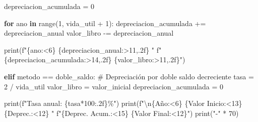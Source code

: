 \documentclass[
  doc,
  floatsintext,
  longtable,
  a4paper,
  nolmodern,
  notxfonts,
  notimes,
  12pt,
  colorlinks=true,linkcolor=blue,citecolor=blue,urlcolor=blue]{apa7}
\newenvironment{Shaded}{\begin{snugshade}}{\end{snugshade}}
\newcommand{\BuiltInTok}[1]{\textcolor[rgb]{0.00,0.23,0.31}{#1}}
\newcommand{\CharTok}[1]{\textcolor[rgb]{0.13,0.47,0.30}{#1}}
\newcommand{\CommentTok}[1]{\textcolor[rgb]{0.37,0.37,0.37}{#1}}
\newcommand{\ControlFlowTok}[1]{\textcolor[rgb]{0.00,0.23,0.31}{\textbf{#1}}}
\newcommand{\DecValTok}[1]{\textcolor[rgb]{0.68,0.00,0.00}{#1}}
\newcommand{\KeywordTok}[1]{\textcolor[rgb]{0.00,0.23,0.31}{\textbf{#1}}}
\newcommand{\NormalTok}[1]{\textcolor[rgb]{0.00,0.23,0.31}{#1}}
\newcommand{\OperatorTok}[1]{\textcolor[rgb]{0.37,0.37,0.37}{#1}}
\newcommand{\SpecialCharTok}[1]{\textcolor[rgb]{0.37,0.37,0.37}{#1}}
\newcommand{\SpecialStringTok}[1]{\textcolor[rgb]{0.13,0.47,0.30}{#1}}
\newcommand{\StringTok}[1]{\textcolor[rgb]{0.13,0.47,0.30}{#1}}
\begin{document}
\begin{Shaded}
\begin{Highlighting}[]
\NormalTok{        depreciacion\_acumulada }\OperatorTok{=} \DecValTok{0}
        
        \ControlFlowTok{for}\NormalTok{ ano }\KeywordTok{in} \BuiltInTok{range}\NormalTok{(}\DecValTok{1}\NormalTok{, vida\_util }\OperatorTok{+} \DecValTok{1}\NormalTok{):}
\NormalTok{            depreciacion\_acumulada }\OperatorTok{+=}\NormalTok{ depreciacion\_anual}
\NormalTok{            valor\_libro }\OperatorTok{{-}=}\NormalTok{ depreciacion\_anual}
            
            \BuiltInTok{print}\NormalTok{(}\SpecialStringTok{f"}\SpecialCharTok{\{}\NormalTok{ano}\SpecialCharTok{:\textless{}6\}}\SpecialStringTok{ }\SpecialCharTok{\{}\NormalTok{depreciacion\_anual}\SpecialCharTok{:\textgreater{}11,.2f\}}\SpecialStringTok{ "}
                  \SpecialStringTok{f"}\SpecialCharTok{\{}\NormalTok{depreciacion\_acumulada}\SpecialCharTok{:\textgreater{}14,.2f\}}\SpecialStringTok{ }\SpecialCharTok{\{}\NormalTok{valor\_libro}\SpecialCharTok{:\textgreater{}11,.2f\}}\SpecialStringTok{"}\NormalTok{)}
    
    \ControlFlowTok{elif}\NormalTok{ metodo }\OperatorTok{==} \StringTok{\textquotesingle{}doble\_saldo\textquotesingle{}}\NormalTok{:}
        \CommentTok{\# Depreciación por doble saldo decreciente}
\NormalTok{        tasa }\OperatorTok{=} \DecValTok{2} \OperatorTok{/}\NormalTok{ vida\_util}
\NormalTok{        valor\_libro }\OperatorTok{=}\NormalTok{ valor\_inicial}
\NormalTok{        depreciacion\_acumulada }\OperatorTok{=} \DecValTok{0}
        
        \BuiltInTok{print}\NormalTok{(}\SpecialStringTok{f"Tasa anual: }\SpecialCharTok{\{}\NormalTok{tasa}\OperatorTok{*}\DecValTok{100}\SpecialCharTok{:.2f\}}\SpecialStringTok{\%"}\NormalTok{)}
        \BuiltInTok{print}\NormalTok{(}\SpecialStringTok{f"}\CharTok{\textbackslash{}n}\SpecialCharTok{\{}\StringTok{\textquotesingle{}Año\textquotesingle{}}\SpecialCharTok{:\textless{}6\}}\SpecialStringTok{ }\SpecialCharTok{\{}\StringTok{\textquotesingle{}Valor Inicio\textquotesingle{}}\SpecialCharTok{:\textless{}13\}}\SpecialStringTok{ }\SpecialCharTok{\{}\StringTok{\textquotesingle{}Deprec.\textquotesingle{}}\SpecialCharTok{:\textless{}12\}}\SpecialStringTok{ "}
              \SpecialStringTok{f"}\SpecialCharTok{\{}\StringTok{\textquotesingle{}Deprec. Acum.\textquotesingle{}}\SpecialCharTok{:\textless{}15\}}\SpecialStringTok{ }\SpecialCharTok{\{}\StringTok{\textquotesingle{}Valor Final\textquotesingle{}}\SpecialCharTok{:\textless{}12\}}\SpecialStringTok{"}\NormalTok{)}
        \BuiltInTok{print}\NormalTok{(}\StringTok{"{-}"} \OperatorTok{*} \DecValTok{70}\NormalTok{)}
        

\end{Highlighting}
\end{Shaded}
\end{document}
